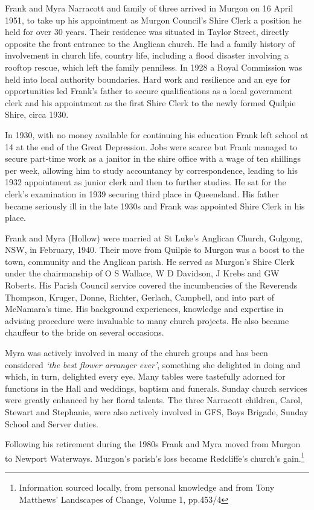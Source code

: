 Frank and Myra Narracott and family of three arrived in Murgon on 16 April 1951, to take up his appointment as Murgon Council's Shire Clerk a position he held for over 30 years. Their residence was situated in Taylor Street, directly opposite the front entrance to the Anglican church. He had a family history of involvement in church life, country life, including a flood disaster involving a rooftop rescue, which left the family penniless. In 1928 a Royal Commission was held into local authority boundaries. Hard work and resilience and an eye for opportunities led Frank's father to secure qualifications as a local government clerk and his appointment as the first Shire Clerk to the newly formed Quilpie Shire, circa 1930.

In 1930, with no money available for continuing his education Frank left school at 14 at the end of the Great Depression. Jobs were scarce but Frank managed to secure part-time work as a janitor in the shire office with a wage of ten shillings per week, allowing him to study accountancy by correspondence, leading to his 1932 appointment as junior clerk and then to further studies. He sat for the clerk's examination in 1939 securing third place in Queensland. His father became seriously ill in the late 1930s and Frank was appointed Shire Clerk in his place.

Frank and Myra (Hollow) were married at St Luke's Anglican Church, Gulgong, NSW, in February, 1940. Their move from Quilpie to Murgon was a boost to the town, community and the Anglican parish. He served as Murgon's Shire Clerk under the chairmanship of O S Wallace, W D Davidson, J Krebs and GW Roberts. His Parish Council service covered the incumbencies of the Reverends Thompson, Kruger, Donne, Richter, Gerlach, Campbell, and into part of McNamara's time. His background experiences, knowledge and expertise in advising procedure were invaluable to many church projects. He also became chauffeur to the bride on several occasions.

Myra was actively involved in many of the church groups and has been considered \emph{`the best flower arranger ever'}, something she delighted in doing and which, in turn, delighted every eye. Many tables were tastefully adorned for functions in the Hall and weddings, baptism and funerals. Sunday church services were greatly enhanced by her floral talents. The three Narracott children, Carol, Stewart and Stephanie, were also actively involved in GFS, Boys Brigade, Sunday School and Server duties.

Following his retirement during the 1980s Frank and Myra moved from Murgon to Newport Waterways. Murgon's parish's loss became Redcliffe's church's gain.\footnote{Information sourced locally, from personal knowledge and from Tony Matthews' Landscapes of Change, Volume 1, pp.453/4}

